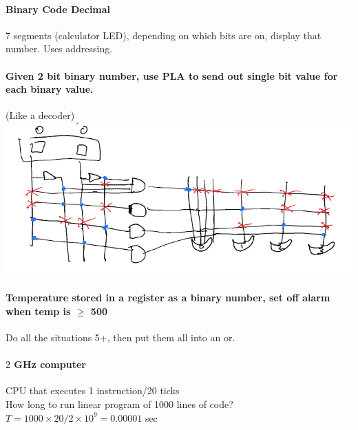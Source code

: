 \documentclass[12 pt]{article}
\begin{document}
		\paragraph{Binary Code Decimal}
		7 segments (calculator LED), depending on which bits are on, display that number. Uses addressing.
		\paragraph{Given 2 bit binary number, use PLA to send out single bit value for each binary value.} (Like a decoder) \\
		\includegraphics[scale=0.8]{pladd}
		\paragraph{Temperature stored in a register as a binary number, set off alarm when temp is $\geq$ 500} Do all the situations 5+, then put them all into an or.
		\paragraph{$2$ GHz computer}
		CPU that executes 1 instruction/20 ticks
		\\ How long to run linear program of 1000 lines of code?
		\\$T=1000\times 20/2\times10^9=0.00001$ sec
\end{document}
